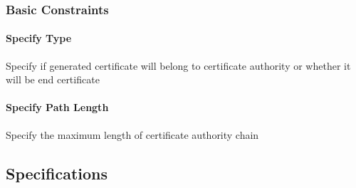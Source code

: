 \documentclass[10pt, a4paper]{report}
\begin{document}
\subsubsection{Basic Constraints}

\paragraph{Specify Type}
Specify if generated certificate will belong to certificate authority or whether it will be end certificate

\paragraph{Specify Path Length}
Specify the maximum length of certificate authority chain


\subsection{Specifications}
\end{document}
